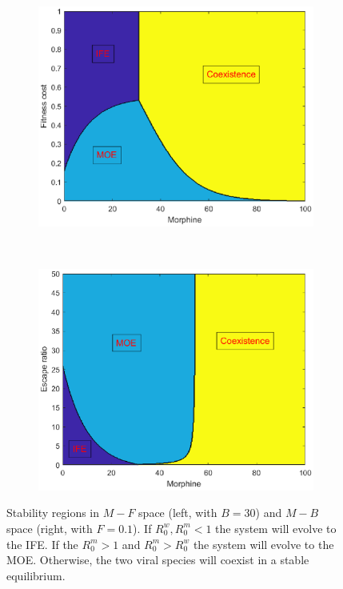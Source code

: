 \documentclass[11pt, oneside]{article}    %
\begin{document}
\begin{figure}[h]
    \centering
    \begin{subfigure}[b]{0.5\textwidth}
        \centering
        \includegraphics[scale=0.55]{MOE_F_contour.eps}
    \end{subfigure}%
    ~ 
    \begin{subfigure}[b]{0.5\textwidth}
        \centering
        \includegraphics[scale=0.55]{MOE_B_contour.eps}
    \end{subfigure}
    \caption{Stability regions in $M-F$ space (left, with $B = 30$) and $M-B$ space (right, with $F=0.1$). If $R_0^w,R_0^m < 1$ the system will evolve to the IFE. If the $R_0^m >1$ and $R_0^m >R_0^w$ the system will evolve to the MOE. Otherwise, the two viral species will coexist in a stable equilibrium.}
\label{fig:stab_regions}
\end{figure}
\end{document}

